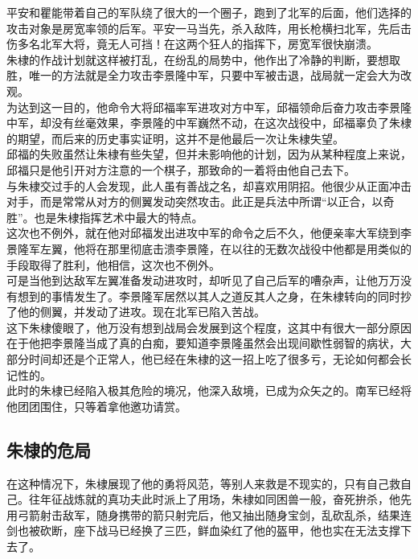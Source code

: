 \begin{multicols}{\theparacolNo}
平安和瞿能带着自己的军队绕了很大的一个圈子，跑到了北军的后面，他们选择的攻击对象是房宽率领的后军。平安一马当先，杀入敌阵，用长枪横扫北军，先后击伤多名北军大将，竟无人可挡！在这两个狂人的指挥下，房宽军很快崩溃。\\

朱棣的作战计划就这样被打乱，在纷乱的局势中，他作出了冷静的判断，要想取胜，唯一的方法就是全力攻击李景隆中军，只要中军被击退，战局就一定会大为改观。\\

为达到这一目的，他命令大将邱福率军进攻对方中军，邱福领命后奋力攻击李景隆中军，却没有丝毫效果，李景隆的中军巍然不动，在这次战役中，邱福辜负了朱棣的期望，而后来的历史事实证明，这并不是他最后一次让朱棣失望。\\

邱福的失败虽然让朱棣有些失望，但并未影响他的计划，因为从某种程度上来说，邱福只是他引开对方注意的一个棋子，那致命的一着将由他自己去下。\\

与朱棣交过手的人会发现，此人虽有善战之名，却喜欢用阴招。他很少从正面冲击对手，而是常常从对方的侧翼发动突然攻击。此正是兵法中所谓“以正合，以奇胜”。也是朱棣指挥艺术中最大的特点。\\

这次也不例外，就在他对邱福发出进攻中军的命令之后不久，他便亲率大军绕到李景隆军左翼，他将在那里彻底击溃李景隆，在以往的无数次战役中他都是用类似的手段取得了胜利，他相信，这次也不例外。\\

可是当他到达敌军左翼准备发动进攻时，却听见了自己后军的嘈杂声，让他万万没有想到的事情发生了。李景隆军居然以其人之道反其人之身，在朱棣转向的同时抄了他的侧翼，并发动了进攻。现在北军已陷入苦战。\\

这下朱棣傻眼了，他万没有想到战局会发展到这个程度，这其中有很大一部分原因在于他把李景隆当成了真的白痴，要知道李景隆虽然会出现间歇性弱智的病状，大部分时间却还是个正常人，他已经在朱棣的这一招上吃了很多亏，无论如何都会长记性的。\\

此时的朱棣已经陷入极其危险的境况，他深入敌境，已成为众矢之的。南军已经将他团团围住，只等着拿他邀功请赏。\\

\subsection{朱棣的危局}
在这种情况下，朱棣展现了他的勇将风范，等别人来救是不现实的，只有自己救自己。往年征战炼就的真功夫此时派上了用场，朱棣如同困兽一般，奋死拚杀，他先用弓箭射击敌军，随身携带的箭只射完后，他又抽出随身宝剑，乱砍乱杀，结果连剑也被砍断，座下战马已经换了三匹，鲜血染红了他的盔甲，他也实在无法支撑下去了。\\


\end{multicols}
